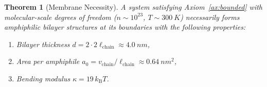 \documentclass[12pt]{article}
\newtheorem{theorem}{Theorem}[section]
\theoremstyle{definition}
\theoremstyle{remark}
\newcommand{\kB}{k_{\mathrm{B}}}
\begin{document}
\begin{theorem}[Membrane Necessity]
\label{thm:membrane_necessity}
A system satisfying Axiom~\ref{ax:bounded} with molecular-scale degrees of freedom ($n \sim 10^{23}$, $T \sim \SI{300}{K}$) necessarily forms amphiphilic bilayer structures at its boundaries with the following properties:
\begin{enumerate}[label=(\alph*)]
  \item Bilayer thickness $d = 2 \cdot 2\ell_{\mathrm{chain}} \approx \SI{4.0}{nm}$,
  \item Area per amphiphile $a_0 = v_{\mathrm{chain}}/\ell_{\mathrm{chain}} \approx \SI{0.64}{nm^2}$,
  \item Bending modulus $\kappa = 19\,\kB T$.
\end{enumerate}
\end{theorem}
\end{document}
